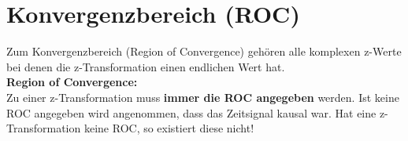 \section{Konvergenzbereich (ROC)}
	Zum Konvergenzbereich (Region of Convergence) gehören alle komplexen z-Werte bei denen die z-Transformation einen endlichen Wert hat.\\[0cm]
	\textbf{Region of Convergence:}$\qquad$\\[0.4cm]
	Zu einer z-Transformation muss \textbf{immer die ROC angegeben} werden. Ist keine ROC angegeben wird angenommen, dass das Zeitsignal kausal war. Hat eine z-Transformation keine ROC, so existiert diese nicht!\\[0.2cm]
	$\quad$\\[0.2cm]
	
